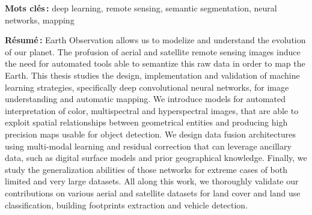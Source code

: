 {\begin{titlepage}
\begin{minipage}{\textwidth}
\bigskip

\textbf{Mots clés\,:} deep learning, remote sensing, semantic segmentation, neural networks, mapping
\begin{multicols}{2}
\textbf{Résumé\,:}
Earth Observation allows us to modelize and understand the evolution of our planet. The profusion of aerial and satellite remote sensing images induce the need for automated tools able to semantize this raw data in order to map the Earth. This thesis studies the design, implementation and validation of machine learning strategies, specifically deep convolutional neural networks, for image understanding and automatic mapping. We introduce models for automated interpretation of color, multispectral and hyperspectral images, that are able to exploit spatial relationships between geometrical entities and producing high precision maps usable for object detection. We design data fusion architectures using multi-modal learning and residual correction that can leverage ancillary data, such as digital surface models and prior geographical knowledge. Finally, we study the generalization abilities of those networks for extreme cases of both limited and very large datasets. All along this work, we thoroughly validate our contributions on various aerial and satellite datasets for land cover and land use classification, building footprints extraction and vehicle detection.
\end{multicols}
\end{minipage}
\end{titlepage}

\restoregeometry
}
\makeatother
